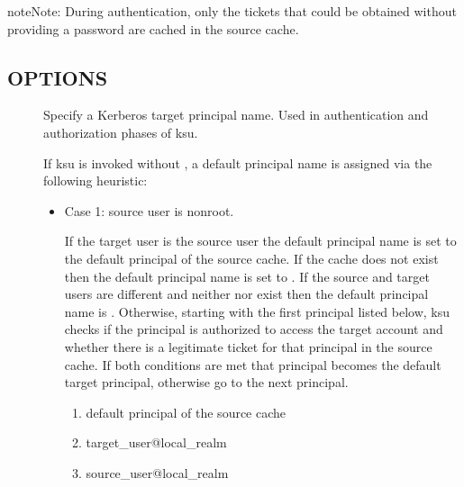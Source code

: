 \documentclass[letterpaper,10pt,english]{sphinxmanual}
\begin{document}
\begin{sphinxadmonition}{note}{Note:}
\sphinxAtStartPar
During authentication, only the tickets that could be
obtained without providing a password are cached in the
source cache.
\end{sphinxadmonition}


\subsection{OPTIONS}
\label{\detokenize{user/user_commands/ksu:options}}\begin{description}
\item[{ }] \leavevmode
\sphinxAtStartPar
Specify a Kerberos target principal name.  Used in authentication
and authorization phases of ksu.

\sphinxAtStartPar
If ksu is invoked without , a default principal name is
assigned via the following heuristic:
\begin{itemize}
\item {} 
\sphinxAtStartPar
Case 1: source user is non\sphinxhyphen{}root.

\sphinxAtStartPar
If the target user is the source user the default principal name
is set to the default principal of the source cache.  If the
cache does not exist then the default principal name is set to
.  If the source and target users are
different and neither  nor
 exist then the default principal name
is .  Otherwise, starting
with the first principal listed below, ksu checks if the
principal is authorized to access the target account and whether
there is a legitimate ticket for that principal in the source
cache.  If both conditions are met that principal becomes the
default target principal, otherwise go to the next principal.
\begin{enumerate}
%
\item {} 
\sphinxAtStartPar
default principal of the source cache

\item {} 
\sphinxAtStartPar
target\_user@local\_realm

\item {} 
\sphinxAtStartPar
source\_user@local\_realm


\end{enumerate}
\end{itemize}
\end{description}
\end{document}
